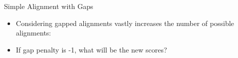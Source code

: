 \documentclass{bredelebeamer}
\begin{document}
\begin{frame}{Simple Alignment with Gaps}
    \begin{itemize}
        \item Considering gapped alignments vastly increases the number of possible alignments:\linebreak
        \linebreak
        \linebreak
        \linebreak
        \item If gap penalty is -1, what will be the new scores?
    \end{itemize}
\end{frame}
\end{document}
